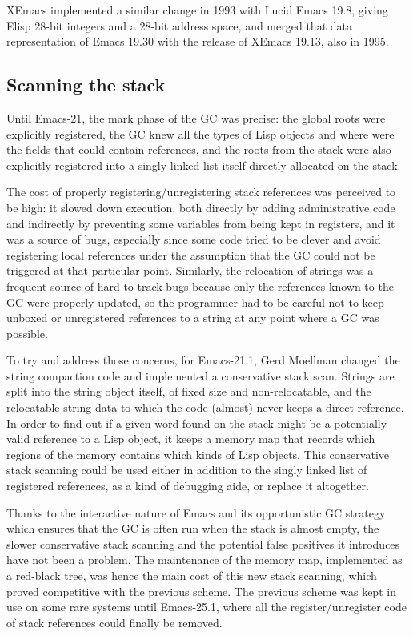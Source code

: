 \documentclass[format=acmsmall, review=false, screen=true]{acmart}
\newcommand \Elisp {Elisp}
\begin{document}
XEmacs implemented a similar change in 1993 with Lucid Emacs 19.8,
giving \Elisp{} 28-bit integers and a 28-bit address space, and
merged that data representation of Emacs 19.30 with the release of XEmacs 19.13, also in
1995.

\subsection{Scanning the stack}
\label{sec:stack-scanning}

Until Emacs-21, the mark phase of the GC was precise: the global roots were
explicitly registered, the GC knew all the types of Lisp objects and where
were the fields that could contain references, and the roots from the stack
were also explicitly registered into a singly linked list itself directly
allocated on the stack.

The cost of properly registering/unregistering stack references was
perceived to be high: it slowed down execution, both directly by adding
administrative code and indirectly by preventing some variables from being
kept in registers, and it was a source of bugs, especially since some code
tried to be clever and avoid registering local references under the
assumption that the GC could not be triggered at that particular point.
Similarly, the relocation of strings was a frequent source of hard-to-track
bugs because only the references known to the GC were properly updated, so
the programmer had to be careful not to keep unboxed or unregistered
references to a string at any point where a GC was possible.

To try and address those concerns, for Emacs-21.1, Gerd Moellman changed the
string compaction code and implemented a conservative stack scan.
Strings are split into the string object itself, of fixed size and
non-relocatable, and the relocatable string data to which the code (almost)
never keeps a direct reference.  In order to find out if a given word found
on the stack might be a potentially valid reference to a Lisp object, it
keeps a memory map that records which regions of the memory contains which
kinds of Lisp objects.  This conservative stack scanning could be used
either in addition to the singly linked list of registered references, as
a kind of debugging aide, or replace it altogether.

Thanks to the interactive nature of Emacs and its opportunistic GC strategy
which ensures that the GC is often run when the stack is almost empty, the
slower conservative stack scanning and the potential false positives it
introduces have not been a problem.  The maintenance of the memory map,
implemented as a red-black tree, was hence the main cost of this new stack
scanning, which proved competitive with the previous scheme.  The previous
scheme was kept in use on some rare systems until Emacs-25.1, where all the
register/unregister code of stack references could finally be removed.
\end{document}
